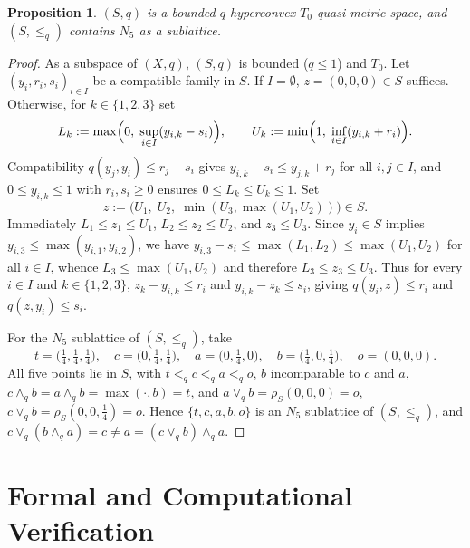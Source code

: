 \documentclass[11pt]{article}
\newtheorem{proposition}[theorem]{Proposition}
\begin{document}
\begin{proposition}\label{prop:S}
$(S, q)$ is a bounded $q$-hyperconvex $T_0$-quasi-metric space, and $(S, \le_q)$
contains $N_5$ as a sublattice.
\end{proposition}

\begin{proof}
As a subspace of $(X, q)$, $(S, q)$ is bounded ($q \le 1$) and $T_0$. Let
$(y_i, r_i, s_i)_{i \in I}$ be a compatible family in $S$. If $I = \emptyset$,
$z = (0, 0, 0) \in S$ suffices. Otherwise, for $k \in \{1, 2, 3\}$ set
\[
L_k := \max\Bigl(0,\; \sup_{i \in I} (y_{i,k} - s_i)\Bigr),
\qquad
U_k := \min\Bigl(1,\; \inf_{i \in I} (y_{i,k} + r_i)\Bigr).
\]
Compatibility $q(y_j, y_i) \le r_j + s_i$ gives $y_{i,k} - s_i \le y_{j,k} + r_j$
for all $i, j \in I$, and $0 \le y_{i,k} \le 1$ with $r_i, s_i \ge 0$ ensures
$0 \le L_k \le U_k \le 1$. Set
\[
z := \bigl(U_1,\; U_2,\; \min(U_3, \max(U_1, U_2))\bigr) \in S.
\]
Immediately $L_1 \le z_1 \le U_1$, $L_2 \le z_2 \le U_2$, and $z_3 \le U_3$.
Since $y_i \in S$ implies $y_{i,3} \le \max(y_{i,1}, y_{i,2})$, we have
$y_{i,3} - s_i \le \max(L_1, L_2) \le \max(U_1, U_2)$ for all $i \in I$, whence
$L_3 \le \max(U_1, U_2)$ and therefore $L_3 \le z_3 \le U_3$. Thus for every
$i \in I$ and $k \in \{1, 2, 3\}$, $z_k - y_{i,k} \le r_i$ and
$y_{i,k} - z_k \le s_i$, giving $q(y_i, z) \le r_i$ and $q(z, y_i) \le s_i$.

For the $N_5$ sublattice of $(S, \le_q)$, take
\[
t = \bigl(\tfrac{1}{4}, \tfrac{1}{4}, \tfrac{1}{4}\bigr),\quad
c = \bigl(0, \tfrac{1}{4}, \tfrac{1}{4}\bigr),\quad
a = \bigl(0, \tfrac{1}{4}, 0\bigr),\quad
b = \bigl(\tfrac{1}{4}, 0, \tfrac{1}{4}\bigr),\quad
o = (0, 0, 0).
\]
All five points lie in $S$, with $t <_q c <_q a <_q o$, $b$ incomparable to $c$
and $a$, $c \wedge_q b = a \wedge_q b = \max(\cdot, b) = t$, and
$a \vee_q b = \rho_S(0, 0, 0) = o$,
$c \vee_q b = \rho_S(0, 0, \tfrac{1}{4}) = o$. Hence $\{t, c, a, b, o\}$ is an
$N_5$ sublattice of $(S, \le_q)$, and
$c \vee_q (b \wedge_q a) = c \neq a = (c \vee_q b) \wedge_q a$.
\end{proof}

\section{Formal and Computational Verification}
\end{document}
